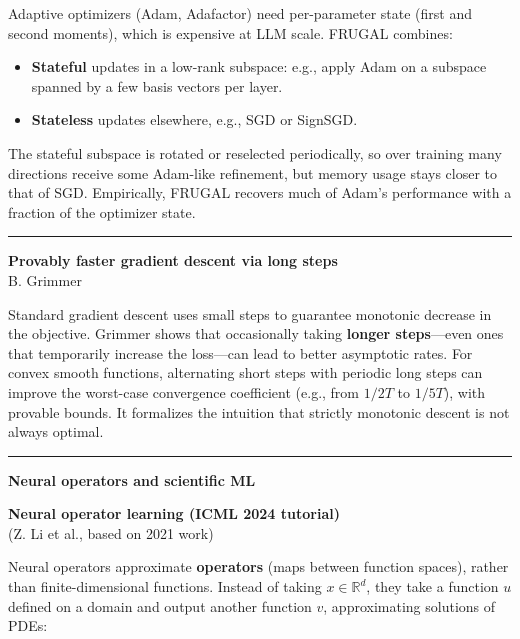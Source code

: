 \documentclass[a5paper]{article}
\providecommand{\tightlist}{%
  \setlength{\itemsep}{0pt}\setlength{\parskip}{0pt}}
\def\subsection#1{{\par\bigskip\goodbreak\large\bfseries #1\par}}
\begin{document}
Adaptive optimizers (Adam, Adafactor) need per-parameter state (first
and second moments), which is expensive at LLM scale. FRUGAL combines:

\begin{itemize}
\tightlist
\item
  \textbf{Stateful} updates in a low-rank subspace: e.g., apply Adam on
  a subspace spanned by a few basis vectors per layer.
\item
  \textbf{Stateless} updates elsewhere, e.g., SGD or SignSGD.
\end{itemize}

The stateful subspace is rotated or reselected periodically, so over
training many directions receive some Adam-like refinement, but memory
usage stays closer to that of SGD. Empirically, FRUGAL recovers much of
Adam's performance with a fraction of the optimizer state.

\begin{center}\rule{0.5\linewidth}{0.5pt}\end{center}

\textbf{Provably faster gradient descent via long steps}\\
B. Grimmer

Standard gradient descent uses small steps to guarantee monotonic
decrease in the objective. Grimmer shows that occasionally taking
\textbf{longer steps}---even ones that temporarily increase the
loss---can lead to better asymptotic rates. For convex smooth functions,
alternating short steps with periodic long steps can improve the
worst-case convergence coefficient (e.g., from $1/2T$ to
$1/5T$), with provable bounds. It formalizes the intuition
that strictly monotonic descent is not always optimal.

\begin{center}\rule{0.5\linewidth}{0.5pt}\end{center}

\subsection{Neural operators and scientific
ML}\label{neural-operators-and-scientific-ml}

\textbf{Neural operator learning (ICML 2024 tutorial)}\\
(Z. Li et al., based on 2021 work)

Neural operators approximate \textbf{operators} (maps between function
spaces), rather than finite-dimensional functions. Instead of taking
$x\in\mathbb{R}^d$, they take a function $u$ defined on a domain and output another
function $v$, approximating solutions of PDEs:
\end{document}
